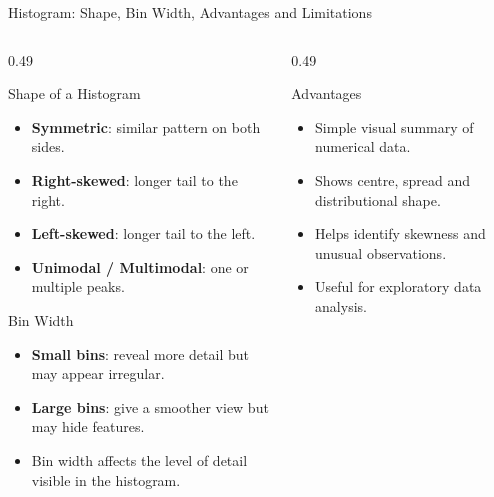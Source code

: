 \documentclass{beamer}
\begin{document}
\begin{frame}{Histogram: Shape, Bin Width, Advantages and Limitations}

\begin{columns}[T,onlytextwidth]

\begin{column}{0.49\textwidth}

\begin{block}{Shape of a Histogram}
\footnotesize
\begin{itemize}
    \setlength{\itemsep}{2pt}
    \item \textbf{Symmetric}: similar pattern on both sides.
    \item \textbf{Right-skewed}: longer tail to the right.
    \item \textbf{Left-skewed}: longer tail to the left.
    \item \textbf{Unimodal / Multimodal}: one or multiple peaks.
\end{itemize}
\end{block}

\vspace{-2mm}

\begin{block}{Bin Width}
\footnotesize
\begin{itemize}
    \setlength{\itemsep}{3pt}
    \item \textbf{Small bins}: reveal more detail but may appear irregular.
    \item \textbf{Large bins}: give a smoother view but may hide features.
    \item {Bin width affects the level of detail visible in the histogram.}
\end{itemize}
\end{block}

\end{column}

\hfill

\begin{column}{0.49\textwidth}

\begin{block}{Advantages}
\footnotesize
\begin{itemize}
    \setlength{\itemsep}{2pt}
    \item Simple visual summary of numerical data.
    \item Shows centre, spread and distributional shape.
    \item Helps identify skewness and unusual observations.
    \item Useful for exploratory data analysis.
\end{itemize}
\end{block}


\end{column}
\end{columns}
\end{frame}
\end{document}
